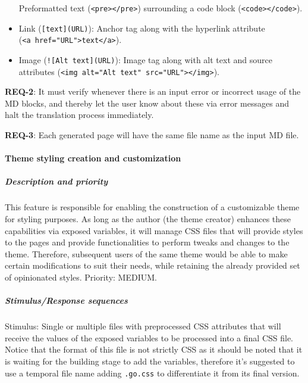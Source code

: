 \begin{itemize}
    Preformatted text
    (\texttt{\textless{}pre\textgreater{}\textless{}/pre\textgreater{}})
    surrounding a code block
    (\texttt{\textless{}code\textgreater{}\textless{}/code\textgreater{}}).
    \item
    Link (\texttt{{[}text{]}(URL)}): Anchor tag along with the hyperlink
    attribute
    (\texttt{\textless{}a\ href="URL"\textgreater{}text\textless{}/a\textgreater{}}).
    \item
    Image (\texttt{!{[}Alt\ text{]}(URL)}): Image tag along with alt text
    and source attributes
    (\texttt{\textless{}img\ alt="Alt\ text"\ src="URL"\textgreater{}\textless{}/img\textgreater{}}).
\end{itemize}

\textbf{REQ-2}: It must verify whenever there is an input error or
incorrect usage of the MD blocks, and thereby let the user know about
these via error messages and halt the translation process immediately.

\textbf{REQ-3}: Each generated page will have the same file name as the
input MD file.

\paragraph{Theme styling creation and
customization}\label{par:theme-styling-creation-and-customization}

\subparagraph{Description and
priority}\label{subpar:description-and-priority-1}

This feature is responsible for enabling the construction of a
customizable theme for styling purposes. As long as the author (the
theme creator) enhances these capabilities via exposed variables, it
will manage CSS files that will provide styles to the pages and provide
functionalities to perform tweaks and changes to the theme. Therefore,
subsequent users of the same theme would be able to make certain
modifications to suit their needs, while retaining the already provided
set of opinionated styles. Priority: MEDIUM.

\subparagraph{Stimulus/Response
sequences}\label{subpar:stimulusresponse-sequences-1}

Stimulus: Single or multiple files with preprocessed CSS attributes that
will receive the values of the exposed variables to be processed into a
final CSS file. Notice that the format of this file is not strictly CSS
as it should be noted that it is waiting for the building stage to add
the variables, therefore it's suggested to use a temporal file name
adding \texttt{.go.css} to differentiate it from its final version.

